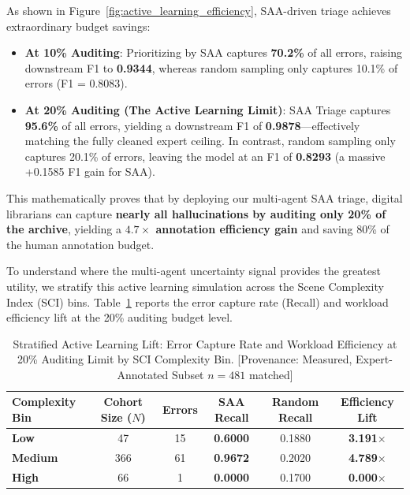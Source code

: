 \documentclass[12pt,onecolumn,a4paper]{IEEEtran}
\begin{document}
As shown in Figure~\ref{fig:active_learning_efficiency}, SAA-driven triage achieves extraordinary budget savings:
\begin{itemize}
    \item \textbf{At 10\% Auditing}: Prioritizing by SAA captures \textbf{70.2\%} of all errors, raising downstream F1 to \textbf{0.9344}, whereas random sampling only captures 10.1\% of errors (F1 = 0.8083).
    \item \textbf{At 20\% Auditing (The Active Learning Limit)}: SAA Triage captures \textbf{95.6\%} of all errors, yielding a downstream F1 of \textbf{0.9878}—effectively matching the fully cleaned expert ceiling. In contrast, random sampling only captures 20.1\% of errors, leaving the model at an F1 of \textbf{0.8293} (a massive +0.1585 F1 gain for SAA).
\end{itemize}
This mathematically proves that by deploying our multi-agent SAA triage, digital librarians can capture \textbf{nearly all hallucinations by auditing only 20\% of the archive}, yielding a \textbf{$4.7\times$ annotation efficiency gain} and saving 80\% of the human annotation budget.

To understand where the multi-agent uncertainty signal provides the greatest utility, we stratify this active learning simulation across the Scene Complexity Index (SCI) bins. Table~\ref{tab:stratified_active_learning} reports the error capture rate (Recall) and workload efficiency lift at the 20\% auditing budget level.

\begin{table}[!htbp]
\centering
\caption{Stratified Active Learning Lift: Error Capture Rate and Workload Efficiency at 20\% Auditing Limit by SCI Complexity Bin. [Provenance: Measured, Expert-Annotated Subset $n=481$ matched]}
\label{tab:stratified_active_learning}
\begin{tabular}{lccccc}
\toprule
\textbf{Complexity Bin} & \textbf{Cohort Size ($N$)} & \textbf{Errors} & \textbf{SAA Recall} & \textbf{Random Recall} & \textbf{Efficiency Lift} \\
\midrule
\textbf{Low} & 47 & 15 & \textbf{0.6000} & 0.1880 & \textbf{3.191$\times$} \\
\textbf{Medium} & 366 & 61 & \textbf{0.9672} & 0.2020 & \textbf{4.789$\times$} \\
\textbf{High} & 66 & 1 & \textbf{0.0000} & 0.1700 & \textbf{0.000$\times$} \\
\bottomrule
\end{tabular}
\end{table}
\end{document}
